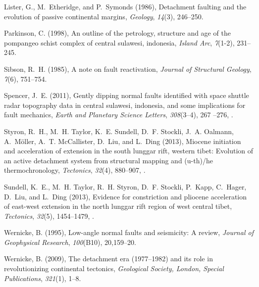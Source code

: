 \documentclass[draft,grl]{AGUTeX}
\begin{document}
\begin{article}
\begin{thebibliography}{29}
Lister, G., M.~Etheridge, and P.~Symonds (1986), Detachment faulting and the
  evolution of passive continental margins, \textit{Geology}, \textit{14}(3),
  246--250.

Parkinson, C. (1998), An outline of the petrology, structure and age of the
  pompangeo schist complex of central sulawesi, indonesia, \textit{Island Arc},
  \textit{7}(1-2), 231--245.

Sibson, R.~H. (1985), A note on fault reactivation, \textit{Journal of
  Structural Geology}, \textit{7}(6), 751--754.

Spencer, J.~E. (2011), Gently dipping normal faults identified with space
  shuttle radar topography data in central sulawesi, indonesia, and some
  implications for fault mechanics, \textit{Earth and Planetary Science
  Letters}, \textit{308}(3–4), 267 --276, .

Styron, R.~H., M.~H. Taylor, K.~E. Sundell, D.~F. Stockli, J.~A. Oalmann,
  A.~M{\"o}ller, A.~T. McCallister, D.~Liu, and L.~Ding (2013), Miocene
  initiation and acceleration of extension in the south lunggar rift, western
  tibet: Evolution of an active detachment system from structural mapping and
  (u-th)/he thermochronology, \textit{Tectonics}, \textit{32}(4), 880--907,
  .

Sundell, K.~E., M.~H. Taylor, R.~H. Styron, D.~F. Stockli, P.~Kapp, C.~Hager,
  D.~Liu, and L.~Ding (2013), Evidence for constriction and pliocene
  acceleration of east-west extension in the north lunggar rift region of west
  central tibet, \textit{Tectonics}, \textit{32}(5), 1454--1479,
  .

Wernicke, B. (1995), Low-angle normal faults and seismicity: A review,
  \textit{Journal of Geophysical Research}, \textit{100}(B10), 20,159--20.

Wernicke, B. (2009), The detachment era (1977--1982) and its role in
  revolutionizing continental tectonics, \textit{Geological Society, London,
  Special Publications}, \textit{321}(1), 1--8.


\end{thebibliography}
\end{article}
\end{document}
